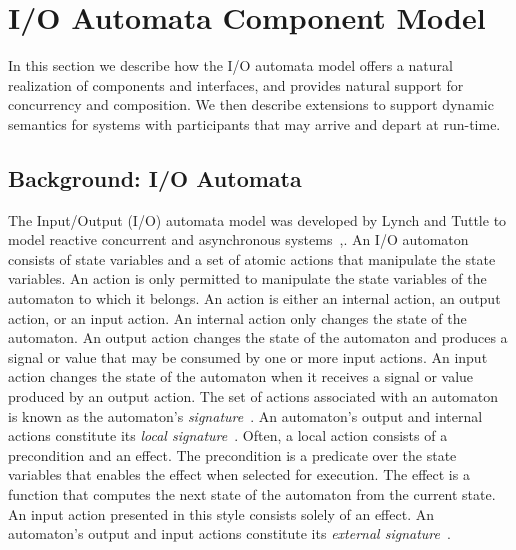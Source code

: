 \section{I/O Automata Component Model\label{component_model}}


In this section we describe how the I/O automata model offers a natural realization of components and interfaces, and provides natural support for concurrency and composition.
We then describe extensions to support dynamic semantics for systems with participants that may arrive and depart at run-time.

\subsection{Background: I/O Automata}

The Input/Output (I/O) automata model was developed by Lynch and Tuttle to model reactive concurrent and asynchronous systems~\cite{lynch1987hierarchical},\cite{lynch1996distributed}.
An I/O automaton consists of state variables and a set of atomic actions that manipulate the state variables.
An action is only permitted to manipulate the state variables of the automaton to which it belongs.
An action is either an internal action, an output action, or an input action.
An internal action only changes the state of the automaton.
An output action changes the state of the automaton and produces a signal or value that may be consumed by one or more input actions.
An input action changes the state of the automaton when it receives a signal or value produced by an output action.
\ifjournal
The set of actions associated with an automaton is known as the automaton's \emph{signature}~\cite{lynch1996distributed}.
\fi
An automaton's output and internal actions constitute its \emph{local signature}~\cite{lynch1996distributed}.
\ifjournal
Often, a local action consists of a precondition and an effect.
The precondition is a predicate over the state variables that enables the effect when selected for execution.
The effect is a function that computes the next state of the automaton from the current state.
An input action presented in this style consists solely of an effect.
\fi
An automaton's output and input actions constitute its \emph{external signature}~\cite{lynch1996distributed}.

